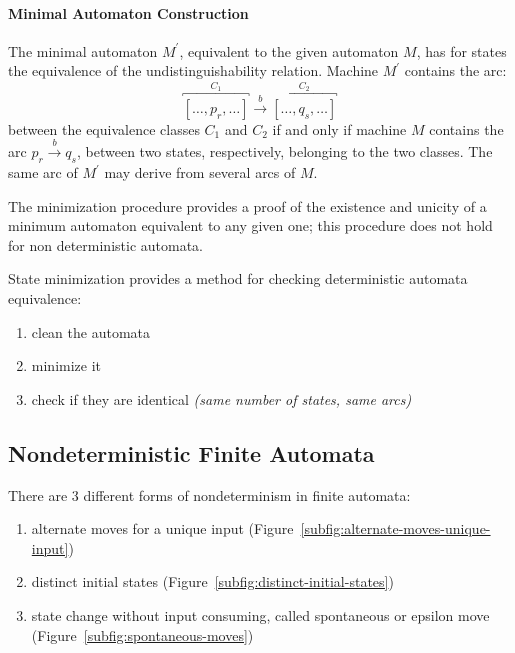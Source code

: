 \documentclass[english]{article}
\begin{document}
\paragraph{Minimal Automaton Construction}

The minimal automaton \(M^\prime\), equivalent to the given automaton \(M\), has for states the equivalence of the undistinguishability relation.
Machine \(M^\prime\) contains the arc:
\[ \overbracket{\left[ \ldots, p_r, \ldots  \right]}^{C_1} \xrightarrow{b} \overbracket{\left[ \ldots, q_s, \ldots  \right]}^{C_2} \]
between the equivalence classes \(C_1\) and \(C_2\) if and only if machine \(M\) contains the arc \(p_r \xrightarrow{b} q_s\), between two states, respectively, belonging to the two classes.
The same arc of \(M^\prime\) may derive from several arcs of \(M\).

The minimization procedure provides a proof of the existence and unicity of a minimum automaton equivalent to any given one;
this procedure does not hold for non deterministic automata.

State minimization provides a method for checking deterministic automata equivalence:

\begin{enumerate}
  \item clean the automata
  \item minimize it
  \item check if they are identical \textit{(same number of states, same arcs)}
\end{enumerate}

\subsection{Nondeterministic Finite Automata}

There are \(3\) different forms of nondeterminism in finite automata:

\begin{enumerate}
  \item alternate moves for a unique input (Figure~\ref{subfig:alternate-moves-unique-input})
  \item distinct initial states (Figure~\ref{subfig:distinct-initial-states})
  \item state change without input consuming, called spontaneous or epsilon move (Figure~\ref{subfig:spontaneous-moves})
\end{enumerate}
\end{document}
